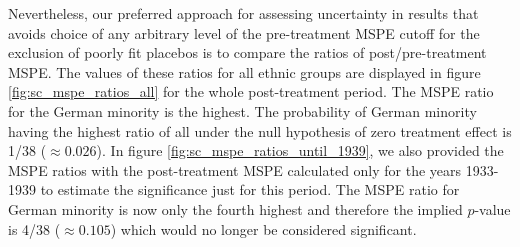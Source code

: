 Nevertheless, our preferred approach for assessing uncertainty in results that avoids  choice of any arbitrary level of the pre-treatment MSPE cutoff for the exclusion of poorly fit  placebos
is to compare the ratios of  post/pre-treatment MSPE. 
The values of these ratios for all ethnic groups are displayed in figure \ref{fig:sc_mspe_ratios_all} for the whole post-treatment period. The MSPE ratio for the German minority is  the highest. The probability of German minority having the highest ratio of all under the null hypothesis of zero treatment effect is 1/38 ($\approx 0.026$). 
In figure \ref{fig:sc_mspe_ratios_until_1939}, we also provided the MSPE ratios  with the post-treatment MSPE calculated only for the years 
1933-1939  to estimate the significance just for this period.
The MSPE ratio for German minority is now only the fourth highest and therefore the implied $p$-value  is  4/38 ($\approx 0.105$) which would no longer be considered significant.  


